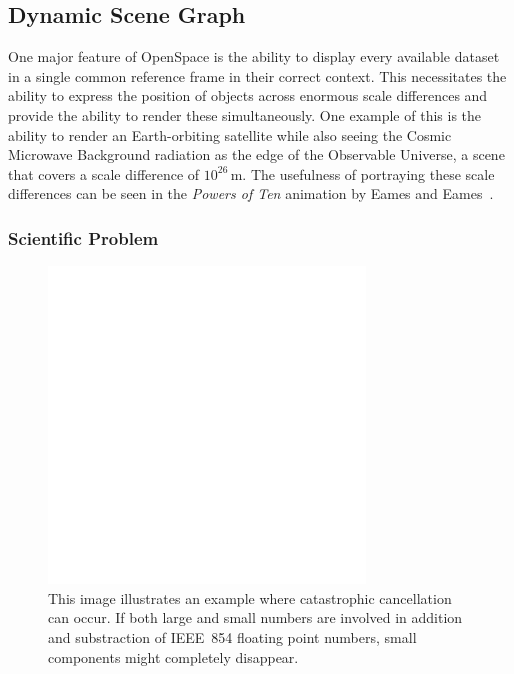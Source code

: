 \subsection{Dynamic Scene Graph} \label{contributions:astro:dsg}
One major feature of OpenSpace is the ability to display every available dataset in a single common reference frame in their correct context.  This necessitates the ability to express the position of objects across enormous scale differences and provide the ability to render these simultaneously.  One example of this is the ability to render an Earth-orbiting satellite while also seeing the Cosmic Microwave Background radiation as the edge of the Observable Universe, a scene that covers a scale difference of $10^26\,$m.  The usefulness of portraying these scale differences can be seen in the \emph{Powers of Ten} animation by Eames and Eames~\cite{morrison1982powers}.

\subsubsection{Scientific Problem} \label{contributions:astro:dsg:problem}
\begin{figure}
\centering
\includegraphics[width=0.75\textwidth]{figures/empty.png}
\caption{This image illustrates an example where catastrophic cancellation can occur.  If both large and small numbers are involved in addition and substraction of IEEE~854 floating point numbers, small components might completely disappear.}
\label{contributions:astro:dsg:cc}
\end{figure}

